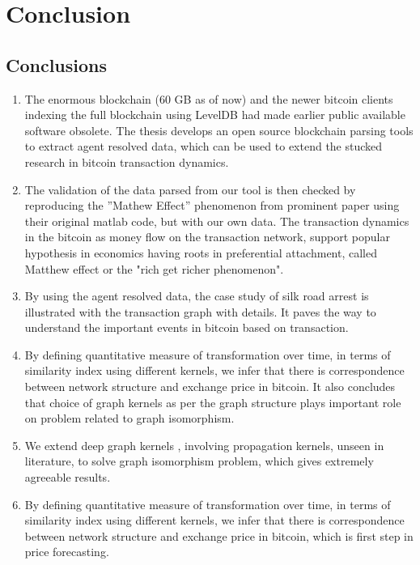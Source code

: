 \chapter{Conclusion} %

\label{Chapter6} %



\section{Conclusions}
\begin{enumerate}

\item The enormous blockchain (60 GB as of now) and the newer bitcoin clients indexing the full blockchain using LevelDB had made earlier public available software obsolete. The thesis develops an open source blockchain parsing tools to extract agent resolved data, which can be used to extend the stucked research in bitcoin transaction dynamics.

\item The validation of the data parsed from our tool is then checked by
reproducing the ”Mathew Effect” phenomenon from prominent paper using their original matlab code, but with our own data. The transaction dynamics in the bitcoin as money flow on the transaction network, support popular hypothesis in economics having roots in preferential attachment, called Matthew effect or the "rich get richer phenomenon".

\item By using the agent resolved data, the case study of silk road arrest is illustrated with the transaction graph with details. It paves the way to understand the important events in bitcoin based on transaction.

\item By defining quantitative measure of transformation over time, in terms of similarity index using different kernels, we infer that there is correspondence between network structure and exchange price in bitcoin. It also concludes that choice of graph kernels as per the graph structure plays important role on problem related to graph isomorphism. 

\item We extend deep graph kernels \citep{Yanardag2015},
involving propagation kernels, unseen in literature, to solve graph isomorphism problem, which gives extremely agreeable results.

\item By defining quantitative measure of transformation over time, in terms of similarity index using different kernels, we infer that there is correspondence between network structure and exchange price in bitcoin, which is first step in price forecasting.

\end{enumerate}

